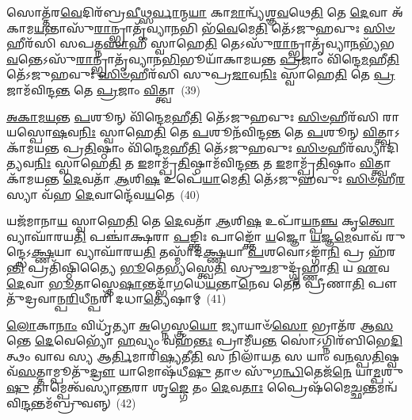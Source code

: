 {\anuvakamend[{\-\ul{𑌮𑌿}\-\-\ul{𑌮𑍀}\-\-\ul{𑌤𑍇} 𑌨𑌾𑌮᳴ \ul{𑌧𑍍𑌰𑍁}\-𑌵𑌾\-𑌽𑌪᳴ \ul{𑌶𑍁}\-𑌚𑌾 𑌤𑍍𑌰𑍀𑌣𑌿᳴ 𑌚}]}%

𑌸𑍋𑌤𑍍𑌤᳴𑌰\-\ul{𑌵𑍇}\-𑌦𑌿𑌰᳴𑌬𑍍𑌰\-\ul{𑌵𑍀}\-𑌥𑍍𑌸\-\ul{𑌰𑍍𑌵𑌾}\-𑌨𑍍𑌮\-\ul{𑌯𑌾} 𑌕𑌾\-\ul{𑌮𑌾}\-𑌨𑍍𑌵𑍍𑌯᳴𑌶𑍍𑌞\-\ul{𑌵}\-𑌥𑍇\-\ul{𑌤𑌿} 𑌤𑍇 \ul{𑌦𑍇}\-𑌵𑌾 𑌅᳴𑌕𑌾𑌮\-\ul{𑌯}\-𑌨𑍍𑌤𑌾𑌸𑍁᳴\-\ul{𑌰𑌾}\-𑌨𑍍𑌭𑍍𑌰𑌾𑌤𑍃᳴𑌵𑍍𑌯𑌾\-\ul{𑌨}\-𑌭𑌿 𑌭᳴\-\ul{𑌵𑍇}\-𑌮𑍇\-\ul{𑌤𑌿} 𑌤𑍇᳴\-𑌽𑌜𑍁𑌹𑌵𑍁𑌃 \ul{𑌸𑌿}\-\-\ul{𑍞}\-𑌹𑍀𑌰᳴𑌸𑌿 𑌸𑌪𑌤𑍍𑌨\-\ul{𑌸𑌾}\-𑌹𑍀 𑌸𑍍𑌵𑌾𑌹𑍇\-\ul{𑌤𑌿} 𑌤𑍇\-𑌽𑌸𑍁᳴\-\ul{𑌰𑌾}\-𑌨𑍍𑌭𑍍𑌰𑌾𑌤𑍃᳴𑌵𑍍𑌯𑌾\-\ul{𑌨}\-𑌭𑍍𑌯᳴𑌭\-\ul{𑌵}\-𑌨𑍍𑌤𑍇\-𑌽𑌸𑍁᳴\-\ul{𑌰𑌾}\-𑌨𑍍𑌭𑍍𑌰𑌾𑌤𑍃᳴𑌵𑍍𑌯𑌾𑌨\-\ul{𑌭𑌿}\-𑌭𑍂𑌯𑌾᳴𑌕𑌾𑌮𑌯𑌨𑍍𑌤 \ul{𑌪𑍍𑌰}\-𑌜𑌾𑌂 𑌵𑌿᳴𑌨𑍍𑌦𑍇\-\ul{𑌮}\-𑌹𑍀\-\ul{𑌤𑌿} 𑌤𑍇᳴\-𑌽𑌜𑍁𑌹𑌵𑍁𑌃 \ul{𑌸𑌿}\-\-\ul{𑍞}\-𑌹𑍀𑌰᳴𑌸𑌿 𑌸𑍁𑌪𑍍𑌰\-\ul{𑌜𑌾}\-𑌵\-\ul{𑌨𑌿𑌃} 𑌸𑍍𑌵𑌾𑌹𑍇\-\ul{𑌤𑌿} 𑌤𑍇 \ul{𑌪𑍍𑌰}\-𑌜𑌾𑌮᳴𑌵𑌿𑌨𑍍𑌦\-\ul{𑌨𑍍𑌤} 𑌤𑍇 \ul{𑌪𑍍𑌰}\-𑌜𑌾𑌂 \ul{𑌵𑌿}\-𑌤𑍍𑌤𑍍𑌵𑌾~(39)

\-\ul{𑌅}\-\-\ul{𑌕𑌾}\-\-\ul{𑌮}\-\-\ul{𑌯}\-\-\ul{𑌨𑍍𑌤} \ul{𑌪}\-𑌶𑍂𑌨𑍍 𑌵𑌿᳴𑌨𑍍𑌦𑍇\-\ul{𑌮}\-𑌹𑍀\-\ul{𑌤𑌿} 𑌤𑍇᳴\-𑌽𑌜𑍁𑌹𑌵𑍁𑌃 \ul{𑌸𑌿}\-\-\ul{𑍞}\-𑌹𑍀𑌰᳴𑌸𑌿 𑌰𑌾𑌯𑌸𑍍𑌪𑍋\-\ul{𑌷}\-𑌵\-\ul{𑌨𑌿𑌃} 𑌸𑍍𑌵𑌾𑌹𑍇\-\ul{𑌤𑌿} 𑌤𑍇 \ul{𑌪}\-𑌶𑍂𑌨᳴𑌵𑌿𑌨𑍍𑌦\-\ul{𑌨𑍍𑌤} 𑌤𑍇 \ul{𑌪}\-𑌶𑍂𑌨𑍍 \ul{𑌵𑌿}\-𑌤𑍍𑌤𑍍𑌵𑌾\-𑌽 𑌕𑌾᳴𑌮𑌯𑌨𑍍𑌤 𑌪𑍍𑌰\-\ul{𑌤𑌿}\-𑌷𑍍𑌠𑌾𑌂 𑌵𑌿᳴𑌨𑍍𑌦𑍇\-\ul{𑌮}\-𑌹𑍀\-\ul{𑌤𑌿} 𑌤𑍇᳴\-𑌽𑌜𑍁𑌹𑌵𑍁𑌃 \ul{𑌸𑌿}\-\-\ul{𑍞}\-𑌹𑍀𑌰᳴𑌸𑍍𑌯𑌾𑌦𑌿\-\ul{𑌤𑍍𑌯}\-𑌵\-\ul{𑌨𑌿𑌃} 𑌸𑍍𑌵𑌾𑌹𑍇\-\ul{𑌤𑌿} 𑌤 \ul{𑌇}\-𑌮𑌾𑌮𑍍𑌪𑍍𑌰᳴\-\ul{𑌤𑌿}\-𑌷𑍍𑌠𑌾𑌮᳴𑌵𑌿𑌨𑍍𑌦\-\ul{𑌨𑍍𑌤} 𑌤 \ul{𑌇}\-𑌮𑌾𑌮𑍍𑌪𑍍𑌰᳴\-\ul{𑌤𑌿}\-𑌷𑍍𑌠𑌾𑌂 \ul{𑌵𑌿}\-𑌤𑍍𑌤𑍍𑌵𑌾𑌕𑌾᳴𑌮𑌯𑌨𑍍𑌤 \ul{𑌦𑍇}\-𑌵𑌤𑌾᳴ \ul{𑌆}\-𑌶𑌿\-\ul{𑌷} 𑌉𑌪𑍇᳴\-\ul{𑌯𑌾}\-𑌮𑍇\-\ul{𑌤𑌿} 𑌤𑍇᳴\-𑌽𑌜𑍁𑌹𑌵𑍁𑌃 \ul{𑌸𑌿}\-\-\ul{𑍞}\-𑌹𑍀\-\ul{𑌰}\-𑌸𑍍𑌯𑌾 𑌵᳴𑌹 \ul{𑌦𑍇}\-𑌵𑌾𑌨𑍍𑌦𑍇᳴𑌵\-\ul{𑌯}\-𑌤𑍇~(40)

𑌯𑌜᳴𑌮𑌾𑌨𑌾\-\ul{𑌯} 𑌸𑍍𑌵𑌾𑌹𑍇\-\ul{𑌤𑌿} 𑌤𑍇 \ul{𑌦𑍇}\-𑌵𑌤𑌾᳴ \ul{𑌆}\-𑌶𑌿\-\ul{𑌷} 𑌉𑌪𑌾᳴\-\ul{𑌯}\-𑌨𑍍𑌪\-\ul{𑌞𑍍𑌚} 𑌕𑍃\-\ul{𑌤𑍍𑌵𑍋} 𑌵𑍍𑌯𑌾𑌘𑌾᳴𑌰𑌯\-\ul{𑌤𑌿} 𑌪𑌞𑍍𑌚𑌾॑𑌕𑍍𑌷𑌰𑌾 \ul{𑌪}\-𑌙𑍍𑌕𑍍𑌤𑌿𑌃 𑌪𑌾𑌙𑍍𑌕𑍍𑌤𑍋᳴ \ul{𑌯}\-𑌜𑍍𑌞𑍋 \ul{𑌯}\-𑌜𑍍𑌞\-\ul{𑌮𑍇}\-𑌵𑌾𑌵᳴ 𑌰𑍁𑌨𑍍𑌦𑍍𑌧𑍇\-𑌽\-\ul{𑌕𑍍𑌷𑍍𑌣}\-𑌯𑌾 𑌵𑍍𑌯𑌾𑌘𑌾᳴𑌰𑌯\-\ul{𑌤𑌿} 𑌤𑌸𑍍𑌮𑌾᳴𑌦\-\ul{𑌕𑍍𑌷𑍍𑌣}\-𑌯𑌾 \ul{𑌪}\-𑌶𑌵𑍋\-𑌽𑌙𑍍𑌗𑌾᳴\-\ul{𑌨𑌿} 𑌪𑍍𑌰 𑌹᳴𑌰\-\ul{𑌨𑍍𑌤𑌿} 𑌪𑍍𑌰𑌤𑌿᳴𑌷𑍍𑌠𑌿𑌤𑍍𑌯𑍈 \ul{𑌭𑍂}\-𑌤𑍇\-\ul{𑌭𑍍𑌯}\-𑌸𑍍𑌤𑍍𑌵𑍇\-\ul{𑌤𑌿} 𑌸𑍍𑌰𑍁\-\ul{𑌚}\-𑌮𑍁𑌦𑍍𑌗𑍃᳴𑌹𑍍𑌣𑌾\-\ul{𑌤𑌿} 𑌯 \ul{𑌏}\-𑌵 \ul{𑌦𑍇}\-𑌵𑌾 \ul{𑌭𑍂}\-𑌤𑌾𑌸𑍍𑌤𑍇\-\ul{𑌷𑌾}\-𑌨𑍍𑌤𑌦𑍍𑌭𑌾᳴\-\ul{𑌗}\-𑌧𑍇\-\ul{𑌯}\-𑌨𑍍𑌤𑌾\-\ul{𑌨𑍇}\-𑌵 𑌤𑍇𑌨᳴ 𑌪𑍍𑌰𑍀𑌣𑌾\-\ul{𑌤𑌿} 𑌪𑍗𑌤𑍁᳴𑌦𑍍𑌰𑌵𑌾𑌨𑍍𑌪\-\ul{𑌰𑌿}\-𑌧𑍀𑌨𑍍𑌪𑌰𑌿᳴ 𑌦𑌧𑌾\-\ul{𑌤𑍍𑌯𑍇}\-𑌷𑌾𑌮𑍍~(41)

\-\ul{𑌲𑍋}\-𑌕𑌾\-\ul{𑌨𑌾𑌂} 𑌵𑌿𑌧𑍃᳴𑌤𑍍𑌯𑌾 \ul{𑌅}\-𑌗𑍍𑌨𑍇𑌸𑍍𑌤𑍍𑌰\-\ul{𑌯𑍋} 𑌜𑍍𑌯𑌾𑌯𑌾𑍞᳴\-\ul{𑌸𑍋} 𑌭𑍍𑌰𑌾𑌤᳴𑌰 𑌆\-\ul{𑌸}\-𑌨𑍍𑌤𑍇 \ul{𑌦𑍇}\-𑌵𑍇𑌭𑍍𑌯𑍋᳴ \ul{𑌹}\-𑌵𑍍𑌯𑌂 𑌵𑌹᳴\-\ul{𑌨𑍍𑌤𑌃} 𑌪𑍍𑌰𑌾𑌮𑍀᳴𑌯\-\ul{𑌨𑍍𑌤} 𑌸𑍋॑\-𑌽𑌗𑍍𑌨𑌿𑌰᳴𑌬𑌿𑌭𑍇\-\ul{𑌦𑌿}\-𑌤𑍍𑌥𑌂 𑌵𑌾𑌵 𑌸𑍍𑌯 𑌆\-\ul{𑌰𑍍𑌤𑌿}\-𑌮𑌾𑌰𑌿᳴\-\ul{𑌷𑍍𑌯}\-𑌤𑍀\-\ul{𑌤𑌿} 𑌸 𑌨𑌿𑌲𑌾᳴𑌯\-\ul{𑌤} 𑌸 𑌯𑌾𑌂 𑌵\-\ul{𑌨}\-𑌸𑍍𑌪\-\ul{𑌤𑌿}\-𑌷𑍍𑌵𑌵᳴\-\ul{𑌸}\-𑌤𑍍𑌤𑌾𑌮𑍍𑌪𑍂𑌤𑍁᳴\-\ul{𑌦𑍍𑌰𑍗} 𑌯𑌾𑌮𑍋𑌷᳴𑌧𑍀\-\ul{𑌷𑍁} 𑌤𑌾𑍞 𑌸𑍁᳴𑌗\-\ul{𑌨𑍍𑌧𑌿}\-𑌤𑍇𑌜᳴\-\ul{𑌨𑍇} 𑌯𑌾\-\ul{𑌮𑍍𑌪}\-𑌶𑍁\-\ul{𑌷𑍁} 𑌤𑌾𑌮𑍍𑌪𑍇𑌤𑍍𑌵᳴𑌸𑍍𑌯𑌾\-\ul{𑌨𑍍𑌤}\-𑌰𑌾 𑌶𑍃\-\ul{𑌙𑍍𑌗𑍇} 𑌤𑌂 \ul{𑌦𑍇}\-𑌵\-\ul{𑌤𑌾𑌃} 𑌪𑍍𑌰𑍈𑌷᳴𑌮𑍈\-\ul{𑌚𑍍𑌛}\-𑌨𑍍𑌤𑌮𑌨𑍍𑌵᳴𑌵𑌿\-\ul{𑌨𑍍𑌦}\-𑌨𑍍𑌤𑌮᳴𑌬𑍍𑌰𑍁𑌵𑌨𑍍𑌨𑍍~(42)

